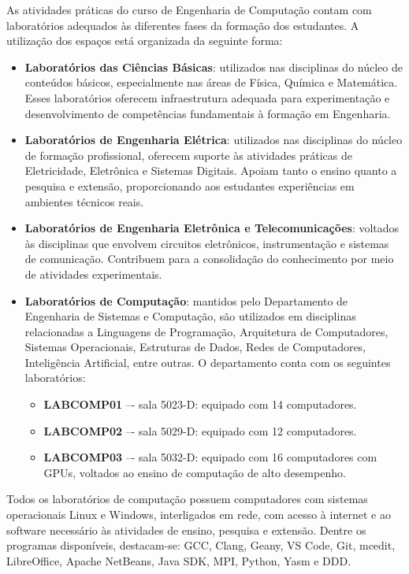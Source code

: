 As atividades práticas do curso de Engenharia de Computação contam com laboratórios adequados às diferentes fases da formação dos estudantes. A utilização dos espaços está organizada da seguinte forma:

\begin{itemize}
    \item \textbf{Laboratórios das Ciências Básicas}: utilizados nas disciplinas do núcleo de conteúdos básicos, especialmente nas áreas de Física, Química e Matemática. Esses laboratórios oferecem infraestrutura adequada para experimentação e desenvolvimento de competências fundamentais à formação em Engenharia.

    \item \textbf{Laboratórios de Engenharia Elétrica}: utilizados nas disciplinas do núcleo de formação profissional, oferecem suporte às atividades práticas de Eletricidade, Eletrônica e Sistemas Digitais. Apoiam tanto o ensino quanto a pesquisa e extensão, proporcionando aos estudantes experiências em ambientes técnicos reais.

    \item \textbf{Laboratórios de Engenharia Eletrônica e Telecomunicações}: voltados às disciplinas que envolvem circuitos eletrônicos, instrumentação e sistemas de comunicação. Contribuem para a consolidação do conhecimento por meio de atividades experimentais.

    \item \textbf{Laboratórios de Computação}: mantidos pelo Departamento de Engenharia de Sistemas e Computação, são utilizados em disciplinas relacionadas a Linguagens de Programação, Arquitetura de Computadores, Sistemas Operacionais, Estruturas de Dados, Redes de Computadores, Inteligência Artificial, entre outras. O departamento conta com os seguintes laboratórios:
          \begin{itemize}
              \item \textbf{LABCOMP01} –- sala 5023-D: equipado com 14 computadores.
              \item \textbf{LABCOMP02} –- sala 5029-D: equipado com 12 computadores.
              \item \textbf{LABCOMP03} –- sala 5032-D: equipado com 16 computadores com GPUs, voltados ao ensino de computação de alto desempenho.
          \end{itemize}
\end{itemize}

Todos os laboratórios de computação possuem computadores com sistemas operacionais Linux e Windows, interligados em rede, com acesso à internet e ao software necessário às atividades de ensino, pesquisa e extensão. Dentre os programas disponíveis, destacam-se: GCC, Clang, Geany, VS Code, Git, mcedit, LibreOffice, Apache NetBeans, Java SDK, MPI, Python, Yasm e DDD.

